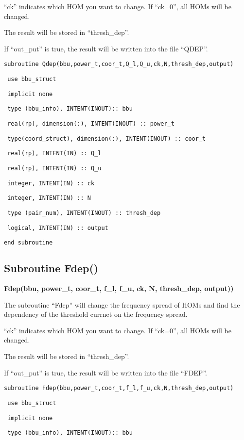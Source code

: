 \documentclass[12pt]{article}
\begin{document}
``ck'' indicates which HOM you want to change. If ``ck=0'', all HOMs will be changed.

The result will be stored in ``thresh\_dep''.

If ``out\_put'' is true, the result will be written into the file ``QDEP''.

\texttt{subroutine Qdep(bbu,power\_t,coor\_t,Q\_l,Q\_u,ck,N,thresh\_dep,output)}

\texttt{    use bbu\_struct}

\texttt{    implicit none}

\texttt{    type (bbu\_info), INTENT(INOUT):: bbu}

\texttt{    real(rp), dimension(:), INTENT(INOUT) :: power\_t}

\texttt{    type(coord\_struct), dimension(:), INTENT(INOUT) :: coor\_t}

\texttt{    real(rp), INTENT(IN) :: Q\_l}

\texttt{    real(rp), INTENT(IN) :: Q\_u}

\texttt{    integer, INTENT(IN) :: ck}

\texttt{    integer, INTENT(IN) :: N}

\texttt{    type (pair\_num), INTENT(INOUT) :: thresh\_dep}

\texttt{    logical, INTENT(IN) :: output}

\texttt{end subroutine}

\subsection{Subroutine Fdep()}
{\bf Fdep(bbu, power\_t, coor\_t, f\_l, f\_u, ck, N, thresh\_dep, output))}

The subroutine ``Fdep'' will change the frequency spread of HOMs and find the dependency of the threshold currnet on the frequency spread.

``ck'' indicates which HOM you want to change. If ``ck=0'', all HOMs will be changed.

The result will be stored in ``thresh\_dep''.

If ``out\_put'' is true, the result will be written into the file ``FDEP''.

\texttt{subroutine Fdep(bbu,power\_t,coor\_t,f\_l,f\_u,ck,N,thresh\_dep,output)}

\texttt{    use bbu\_struct}

\texttt{    implicit none}

\texttt{    type (bbu\_info), INTENT(INOUT):: bbu}
\end{document}
